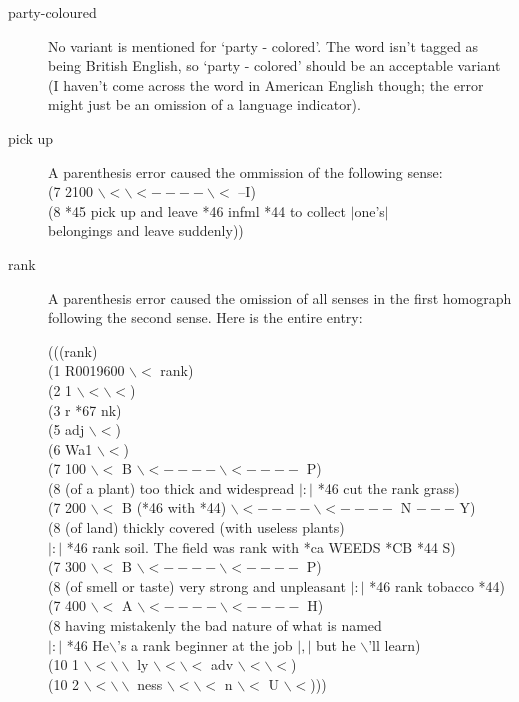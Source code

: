 \begin{description}
\item [party-coloured]   No variant is mentioned for `party - colored'.
The word isn't tagged as being British English, so `party - colored' should
be an acceptable variant (I haven't come across the word in American English
though; the error might just be an omission of a language indicator).


\item [pick up] A parenthesis error caused the ommission of the following sense: \\
\indent
(7 2100 $\backslash< \backslash< ---- \backslash<$ --I) \\
\indent
(8 *45 pick up and leave *46 infml *44 to collect $|$one's$|$ \\
belongings and leave suddenly))


\item [rank] A parenthesis error caused the omission of all senses in the first homograph following the
second sense.  Here is the entire entry:

\indent (((rank) \\
\indent (1 R0019600 $\backslash <$ rank) \\
\indent (2 1 $\backslash< \backslash<$)  \\
\indent (3 r *67 nk) \\
\indent (5 adj $\backslash <$) \\
\indent (6 Wa1 $\backslash <$) \\
\indent (7 100 $\backslash <$ B $\backslash < ---- \backslash < ----$ P) \\
\indent (8 (of a plant) too thick and widespread $|:|$ *46 cut the rank grass) \\
\indent (7 200 $\backslash <$ B (*46 with *44) $\backslash < ---- \backslash < ----$ N $ ---$ Y) \\
\indent (8 (of land) thickly covered (with useless plants)  \\
\indent $|:|$ *46 rank soil.  The field was rank with *ca WEEDS *CB *44 S)  \\
\indent (7 300 $\backslash <$ B $\backslash < ---- \backslash < ----$ P)  \\
\indent (8 (of smell or taste) very strong and unpleasant
\indent $|:|$ *46 rank tobacco *44) \\
\indent (7 400 $\backslash <$ A $\backslash < ---- \backslash < ----$ H)  \\
\indent (8 having mistakenly the bad nature of what is named \\
\indent  $|:|$ *46 He$\backslash$'s a rank beginner at the job  $|,|$ but he $\backslash$'ll learn) \\
\indent (10 1 $\backslash < \backslash \backslash$  ly $\backslash < \backslash <$ adv $\backslash < \backslash <$)  \\
\indent (10 2 $\backslash < \backslash \backslash$ ness $ \backslash < \backslash <$ n $\backslash <$ U $\backslash <$)))



\end{description}
